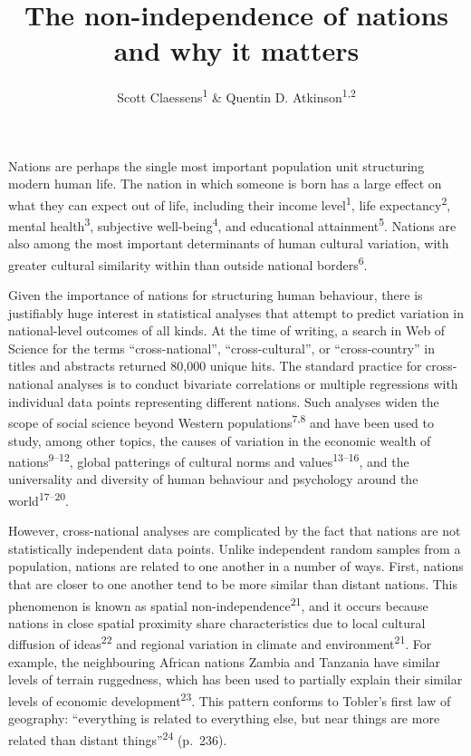 \documentclass[english,man,floatsintext]{apa6}
\title{The non-independence of nations and why it matters}
\author{Scott Claessens\textsuperscript{1} \& Quentin D. Atkinson\textsuperscript{1,2}}
\date{}
\affiliation{\vspace{0.5cm}\textsuperscript{1} School of Psychology, University of Auckland, Auckland, New Zealand\\\textsuperscript{2} Max Planck Institute for the Science of Human History, Jena, Germany}
\begin{document}
\maketitle

Nations are perhaps the single most important population unit structuring modern human life. The nation in which someone is born has a large effect on what they can expect out of life, including their income level\textsuperscript{1}, life expectancy\textsuperscript{2}, mental health\textsuperscript{3}, subjective well-being\textsuperscript{4}, and educational attainment\textsuperscript{5}. Nations are also among the most important determinants of human cultural variation, with greater cultural similarity within than outside national borders\textsuperscript{6}.

Given the importance of nations for structuring human behaviour, there is justifiably huge interest in statistical analyses that attempt to predict variation in national-level outcomes of all kinds. At the time of writing, a search in Web of Science for the terms \enquote{cross-national}, \enquote{cross-cultural}, or \enquote{cross-country} in titles and abstracts returned 80,000 unique hits. The standard practice for cross-national analyses is to conduct bivariate correlations or multiple regressions with individual data points representing different nations. Such analyses widen the scope of social science beyond Western populations\textsuperscript{7,8} and have been used to study, among other topics, the causes of variation in the economic wealth of nations\textsuperscript{9--12}, global patterings of cultural norms and values\textsuperscript{13--16}, and the universality and diversity of human behaviour and psychology around the world\textsuperscript{17--20}.

However, cross-national analyses are complicated by the fact that nations are not statistically independent data points. Unlike independent random samples from a population, nations are related to one another in a number of ways. First, nations that are closer to one another tend to be more similar than distant nations. This phenomenon is known as spatial non-independence\textsuperscript{21}, and it occurs because nations in close spatial proximity share characteristics due to local cultural diffusion of ideas\textsuperscript{22} and regional variation in climate and environment\textsuperscript{21}. For example, the neighbouring African nations Zambia and Tanzania have similar levels of terrain ruggedness, which has been used to partially explain their similar levels of economic development\textsuperscript{23}. This pattern conforms to Tobler's first law of geography: \enquote{everything is related to everything else, but near things are more related than distant things}\textsuperscript{24} (p.~236).
\end{document}
